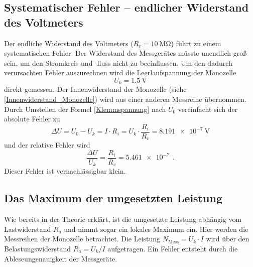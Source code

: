 \subsection{Systematischer Fehler -- endlicher Widerstand des Voltmeters}
\label{systhematischer_fehler}
Der endliche Widerstand des Voltmeters ($R_v = \SI{10}{\mega\ohm}$) führt zu einem systematischen Fehler. Der Widerstand des Messgerätes müsste unendlich groß sein, um den Stromkreis und -fluss nicht zu beeinflussen. Um den dadurch verursachten Fehler auszurechnen wird die Leerlaufspannung der Monozelle
\begin{equation}
U_k = \SI{1.5}{\volt}
\end{equation}
direkt gemessen.
Der Innenwiderstand der Monozelle (siehe \eqref{Innenwiderstand_Monozelle}) wird aus einer anderen Messreihe übernommen. Durch Umstellen der Formel \eqref{Klemmspannung} nach $U_0$ vereinfacht sich der absolute Fehler zu 
\begin{equation}
\Delta U = U_0 - U_k = I\cdot R_i = U_k \cdot \frac{R_i}{R_v} = \SI{8.191e-7}{\volt}
\end{equation}
und der relative Fehler wird 
\begin{equation}
\frac{\Delta U}{U_k} = \frac{R_i}{R_v} = \SI{5.461e-7}{} \ .
\end{equation}
Dieser Fehler ist vernachlässigbar klein.
\clearpage 
 
\subsection{Das Maximum der umgesetzten Leistung}
Wie bereits in der Theorie erklärt, ist die umgesetzte Leistung abhängig vom Lastwiderstand $R_a$ und nimmt sogar ein lokales Maximum ein. Hier werden die Messreihen der Monozelle betrachtet. Die Leistung $N_\text{Mess} = U_k \cdot I $ wird über den Belastungswiderstand $R_a = U_k / I$ aufgetragen. Ein Fehler entsteht durch die Ableseungenauigkeit der Messgeräte.

\begin{center}

\label{Werte_Leistung}
\end{center}

